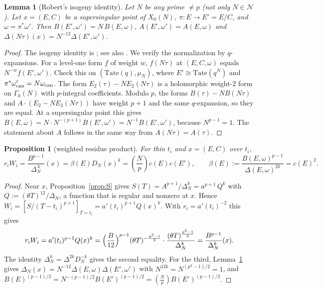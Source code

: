 \documentclass[11pt,a4paper]{article}
\numberwithin{equation}{section}
\newtheorem{proposition}[theorem]{Proposition}
\newtheorem{lemma}[theorem]{Lemma}
\theoremstyle{definition}
\theoremstyle{remark}
\newcommand{\Lp}[1]{\left(\frac{#1}{p}\right)}
\begin{document}
\begin{lemma}[Robert's isogeny identity]\label{lem:Bisog}
Let $N$ be any prime $\ne p$ (not only $N\in\mathcal N$). Let $x=(E,C)$ be a supersingular point of
$X_0(N)$, $\pi:E\to E'=E/C$, and $\omega=\pi^*\omega'$. Then
$B(E',\omega')=N\,B(E,\omega)$, $A(E',\omega')=A(E,\omega)$ and
$\Delta(N\tau)(x)=N^{-12}\Delta(E',\omega')$.
\end{lemma}
\begin{proof}
The isogeny identity is \citet[Th\'eor\`eme B; \S3.3, Lemma~7]{Robert80}; see also
\citet[Lemma~2.2]{Baker98}. We verify the normalization by $q$-expansions.
For a level-one form $f$ of weight $w$, $f(N\tau)$ at $(E,C,\omega)$ equals $N^{-w}f(E',\omega')$. Check
this on $(\mathrm{Tate}(q),\mu_N)$, where $E'\cong\mathrm{Tate}(q^N)$ and
$\pi^*\omega_{\rm can}'=N\omega_{\rm can}$. The form $E_2(\tau)-NE_2(N\tau)$ is a holomorphic
weight-$2$ form on $\Gamma_0(N)$ with $p$-integral coefficients. Modulo $p$, the forms
$B(\tau)-NB(N\tau)$ and $A\cdot(E_2-NE_2(N\tau))$ have weight $p+1$ and the same $q$-expansion, so they
are equal. At a supersingular point this gives $B(E,\omega)=N\cdot N^{-(p+1)}B(E',\omega')=N^{-1}B(E',\omega')$,
because $N^{p-1}=1$. The statement about $A$ follows in the same way from $A(N\tau)=A(\tau)$.
\end{proof}

\begin{proposition}[weighted residue product]\label{prop:product}
For thin $t_i$ and $x=(E,C)$ over $t_i$,
\[
r_iW_i=\frac{B^{p-1}}{\Delta_N^{\,k}}(x)=\beta(E)D_N(x)^k
=\Lp{N}c(E)c(E'),\qquad \beta(E):=\frac{B(E,\omega)^{p-1}}{\Delta(E,\omega)^{2k}}=c(E)^2.
\]
\end{proposition}
\begin{proof}
Near $x$, Proposition~\ref{prop:S} gives $S(T)=A^{p+1}/\Delta_N^k=a^{p+1}\,Q^{k}$ with
$Q:=(\theta T)^{12}/\Delta_N$, a function that is regular and nonzero at $x$. Hence
$W_i=[S/(T-t_i)^{p+1}]_{T=t_i}=a'(t_i)^{p+1}Q(x)^k$. With $r_i=a'(t_i)^{-2}$ this gives
\[
r_iW_i=a'(t_i)^{p-1}Q(x)^k=\Bigl(\frac{B}{12}\Bigr)^{p-1}(\theta T)^{-\frac{p^2-1}2}\cdot
\frac{(\theta T)^{\frac{p^2-1}{2}}}{\Delta_N^{k}}=\frac{B^{p-1}}{\Delta_N^k}(x).
\]
The identity $\Delta_N^k=\Delta^{2k}D_N^{-k}$ gives the second equality. For the third,
Lemma~\ref{lem:Bisog} gives $\Delta_N(x)=N^{-12}\Delta(E,\omega)\Delta(E',\omega')$ with
$N^{12k}=N^{(p^2-1)/2}=1$, and $B(E)^{(p-1)/2}=N^{-(p-1)/2}B(E')^{(p-1)/2}=\Lp NB(E')^{(p-1)/2}$.
\end{proof}
\end{document}
